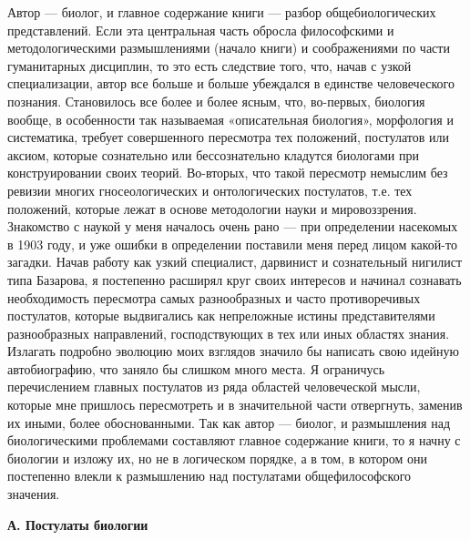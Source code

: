 Автор --- биолог, и главное содержание книги --- разбор
общебиологических представлений. Если эта центральная часть обросла
философскими и методологическими размышлениями (начало книги) и
соображениями по части гуманитарных дисциплин, то это есть следствие
того, что, начав с узкой специализации, автор все больше и больше
убеждался в единстве человеческого познания. Становилось все более и
более ясным, что, во-первых, биология вообще, в особенности так
называемая «описательная биология», морфология и систематика, требует
совершенного пересмотра тех положений, постулатов или аксиом, которые
сознательно или бессознательно кладутся биологами при конструировании
своих теорий. Во-вторых, что такой пересмотр немыслим без ревизии
многих гносеологических и онтологических постулатов, т.е. тех
положений, которые лежат в основе методологии науки и мировоззрения.
Знакомство с наукой у меня началось очень рано --- при определении
насекомых в 1903 году, и уже ошибки в определении поставили меня перед
лицом какой-то загадки. Начав работу как узкий специалист, дарвинист и
сознательный нигилист типа Базарова, я постепенно расширял круг своих
интересов и начинал сознавать необходимость пересмотра самых
разнообразных и часто противоречивых постулатов, которые выдвигались
как непреложные истины представителями разнообразных направлений,
господствующих в тех или иных областях знания. Излагать подробно
эволюцию моих взглядов значило бы написать свою идейную автобиографию,
что заняло бы слишком много места. Я ограничусь перечислением главных
постулатов из ряда областей человеческой мысли, которые мне пришлось
пересмотреть и в значительной части отвергнуть, заменив их иными,
более обоснованными. Так как автор --- биолог, и размышления над
биологическими проблемами составляют главное содержание книги, то я
начну с биологии и изложу их, но не в логическом порядке, а в том, в
котором они постепенно влекли к размышлению над постулатами
общефилософского значения.

\begin{center}
  \textbf{А. Постулаты биологии}
\end{center}

